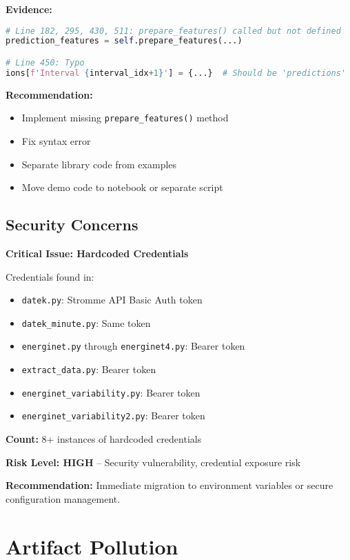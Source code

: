 \documentclass[11pt,a4paper]{article}
\begin{document}
\textbf{Evidence:}
\begin{lstlisting}[language=Python, caption={Code issues in prediction system}]
# Line 182, 295, 430, 511: prepare_features() called but not defined
prediction_features = self.prepare_features(...)

# Line 450: Typo
ions[f'Interval {interval_idx+1}'] = {...}  # Should be 'predictions'
\end{lstlisting}

\textbf{Recommendation:}
\begin{itemize}
    \item Implement missing \texttt{prepare\_features()} method
    \item Fix syntax error
    \item Separate library code from examples
    \item Move demo code to notebook or separate script
\end{itemize}

\subsection{Security Concerns}

\textbf{Critical Issue: Hardcoded Credentials}

Credentials found in:
\begin{itemize}
    \item \texttt{datek.py}: Stromme API Basic Auth token
    \item \texttt{datek\_minute.py}: Same token
    \item \texttt{energinet.py} through \texttt{energinet4.py}: Bearer token
    \item \texttt{extract\_data.py}: Bearer token
    \item \texttt{energinet\_variability.py}: Bearer token
    \item \texttt{energinet\_variability2.py}: Bearer token
\end{itemize}

\textbf{Count:} 8+ instances of hardcoded credentials

\textbf{Risk Level: HIGH} -- Security vulnerability, credential exposure risk

\textbf{Recommendation:} Immediate migration to environment variables or secure configuration management.

\section{Artifact Pollution}
\end{document}
